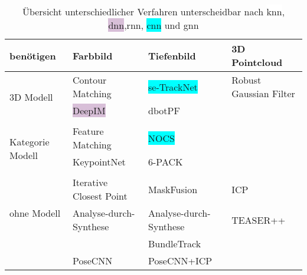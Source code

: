 \documentclass[a4paper, 11pt]{article}
\begin{document}
\begin{table}
    \centering
    \begin{tabular}{p{1.5cm}|l|l|l}
        benötigen                             & Farbbild                                          & Tiefenbild                                             & 3D Pointcloud                               \\\hline
        \multirow{3}{1.5cm}{3D Modell}        & Contour Matching                                  & \colorbox{Cyan}{se-TrackNet}\cite{se-TrackNet}         & Robust Gaussian Filter\cite{GaussianFilter} \\
                                              & \colorbox{Thistle}{DeepIM}\cite{Deepim}           & dbotPF\cite{dbotPF}                                    &                                             \\
                                              &                                                   &                                                        &                                             \\\hline
        \multirow{3}{1.5cm}{Kategorie Modell} & Feature Matching                                  & \colorbox{Cyan}{NOCS}\cite{NormalizedObjectCoordiante} &                                             \\
                                              & KeypointNet\cite{KeypointNet}                     & 6-PACK\cite{6pack}                                     &                                             \\
                                              &                                                   &                                                        &                                             \\\hline
        \multirow{3}{1.5cm}{ohne Modell}      & Iterative Closest Point                           & MaskFusion\cite{MaskFusion}                            & ICP\cite{ICP}                               \\
                                              & Analyse-durch-Synthese \cite{CategoryLevelObject} & Analyse-durch-Synthese \cite{CategoryLevelObject}      & TEASER++\cite{Teaser++}                     \\
                                              &                                                   & \colorbox{YellowOrange}{BundleTrack}\cite{BundleTrack} &                                             \\
                                              & PoseCNN\cite{PoseCNN}                             & PoseCNN\cite{PoseCNN}+ICP\cite{ICP}                    &                                             \\
    \end{tabular}
    \caption{Übersicht unterschiedlicher Verfahren unterscheidbar nach \colorbox{White}{\Gls{knn}}, \colorbox{Thistle}{\Gls{dnn}},\colorbox{YellowOrange}{\Gls{rnn}}, \colorbox{Cyan}{\Gls{cnn}} und \colorbox{OliveGreen}{\Gls{gnn}} }
    \label{ubersicht}
\end{table}

\medskip

\printglossary[title=Glossar]

\printbibliography[title=Literatur]
\end{document}
